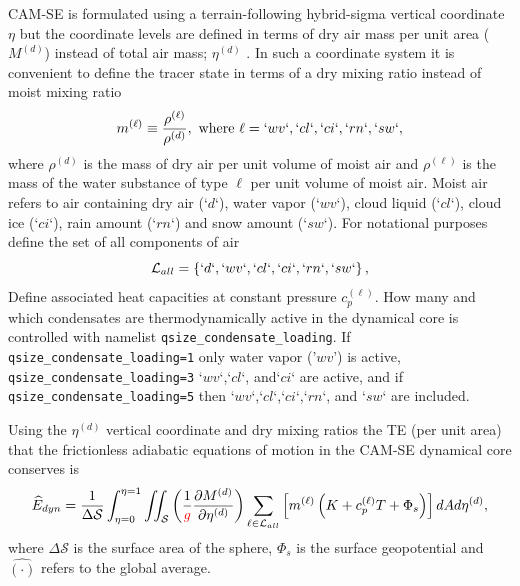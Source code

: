 \documentclass[draft,linenumbers]{agujournal}
\newcommand*{\gi}[1]{\widehat{#1}}
\begin{document}
CAM-SE is formulated using a terrain-following hybrid-sigma vertical coordinate $\eta$ but the coordinate levels are defined in terms of dry air mass per unit area ($M^{(d)}$) instead of total air mass; $\eta^{(d)}$ \citep[see ][ for details]{LetAl2018JAMES}. In such a coordinate system it is convenient to define the tracer state in terms of a dry mixing ratio instead of moist mixing ratio
\begin{equation}
m^{(\ell)}\equiv \frac{\rho^{(\ell)}}{\rho^{(d)}}, \text{ where }\ell=`wv`,`cl`,`ci`,`rn`,`sw`,\label{eq:mx}
\end{equation}
where $\rho^{(d)}$ is the mass of dry air per unit volume of moist air and $\rho^{(\ell)}$ is the mass of the water substance of type $\ell$ per unit volume of moist air. Moist air refers to air containing dry air (`$d$`), water vapor (`$wv$`), cloud liquid (`$cl$`), cloud ice (`$ci$`), rain amount (`$rn$`) and snow amount (`$sw$`). For notational purposes define the set of all components of air
\begin{equation}
\mathcal{L}_{all}=\left\{ `d`,`wv`,`cl`,`ci`,`rn`,`sw`\right\},
\end{equation}
Define associated heat capacities at constant pressure $c_p^{(\ell)}$. {}  How many and which condensates are thermodynamically{\color{red}{/inertially}} active in the dynamical core is controlled with namelist {\tt{qsize\_condensate\_loading}}. If {\tt{qsize\_condensate\_loading=1}} only water vapor ('$wv$') is active, {\tt{qsize\_condensate\_loading=3}} `$wv$`,`$cl$`, and`$ci$` are active, and if {\tt{qsize\_condensate\_loading=5}} then `$wv$`,`$cl$`,`$ci$`,`$rn$`, and `$sw$` are included.

Using the $\eta^{(d)}$ vertical coordinate and dry mixing ratios the TE (per unit area) that the frictionless adiabatic equations of motion in the CAM-SE dynamical core conserves is
\begin{equation}
\gi{E}_{dyn}=\frac{1}{\Delta \mathcal{S}}\int_{\eta=0}^{\eta=1} \iint_\mathcal{S} \left( \frac{1}{{\color{red}{g}}}\frac{\partial M^{(d)}}{\partial \eta^{(d)}} \right)\sum_{\ell \in \mathcal{L}_{all}} \left[m^{(\ell)} \left(K+c_p^{(\ell)}T+\Phi_s  \right)\right]  dA d \eta^{(d)},\label{eq:comprehensice_energy}
\end{equation}
where $\Delta \mathcal{S}$ is the surface area of the sphere, $\Phi_s$ is the surface geopotential and $\gi{(\cdot)}$ refers to the global average.
\end{document}
